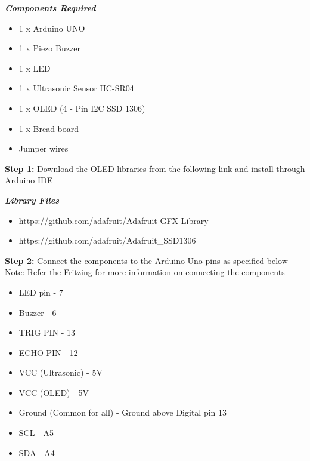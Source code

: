 \documentclass[12pt,a4paper]{article}
\begin{document}
\begin{flushleft}
\textbf{\textit{Components Required}}
\begin{itemize}[noitemsep,nolistsep]
\item 1 x Arduino UNO
\item 1 x Piezo Buzzer
\item 1 x LED
\item 1 x Ultrasonic Sensor HC-SR04
\item 1 x OLED (4 - Pin I2C SSD 1306)
\item 1 x Bread board
\item Jumper wires
\end{itemize}
\vspace{5mm}

\textbf{Step 1:} Download the OLED libraries from the following link and install through Arduino IDE \\
\vspace{5mm}

\textbf{\textit{Library Files}}\\ \begin{itemize}[noitemsep,nolistsep]
\item https://github.com/adafruit/Adafruit-GFX-Library
\item https://github.com/adafruit/Adafruit\_SSD1306
\end{itemize}
\vspace{5mm}

\textbf{Step 2:} Connect the components to the Arduino Uno pins as specified below  \\
Note: Refer the Fritzing for more information on connecting the components \\
\vspace{5mm}
\begin{itemize}[noitemsep,nolistsep]
    \item LED pin - 7
    \item Buzzer - 6 
    \item TRIG PIN - 13 
    \item ECHO PIN - 12 
    \item VCC (Ultrasonic) - 5V 
    \item VCC (OLED) - 5V 
    \item Ground (Common for all) - Ground above Digital pin 13
    \item SCL - A5 
    \item SDA -  A4 
\end{itemize}
\vspace{5mm}


\end{flushleft}
\end{document}
